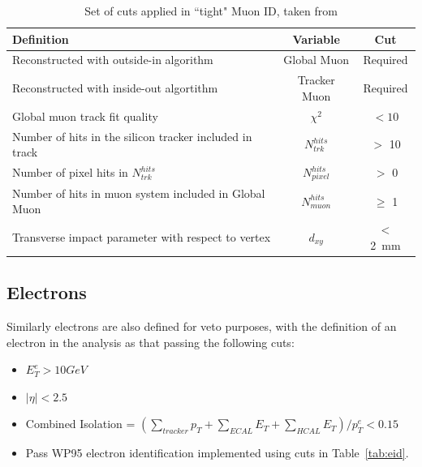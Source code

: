 \begin{table}[htbp]
\centering
\begin{tabular}{ m{8.9cm} c c }
\hline
\hline
 \centering Definition & Variable & Cut \\
\hline
\hline
 Reconstructed with outside-in algorithm & Global Muon & Required\\
Reconstructed with inside-out algortithm & Tracker Muon & Required\\
 Global muon track fit quality & $\chi^{2}$ & $< 10$ \\
Number of hits in the silicon tracker included in track & $N^{hits}_{\textit{trk}}$ &$ >$ 10\\
Number of pixel hits in $N^{hits}_{trk}$ & $N^{hits}_{\textit{pixel}}$ & $ > $ 0\\
Number of hits in muon system included in Global Muon & $N^{hits}_{\textit{muon}}$ & $\geq $ 1\\
Transverse impact parameter with respect to vertex & $d_{xy}$ & $< $ 2~mm\\
\hline
\end{tabular}
\caption{\label{tab:muid} Set of cuts applied in ``tight" Muon ID, taken from \cite{MUO-10-002}}
\end{table}



\subsection{Electrons}
Similarly electrons are also defined for veto purposes, with the definition of an electron in the analysis as that passing the following cuts:

\begin{itemize}
\item $E^{e}_{T} > 10 GeV$
\item $|\eta| < 2.5$
\item Combined Isolation = $(\sum_{tracker} p_{T} + \sum_{ECAL}E_{T} + \sum_{HCAL}E_{T})/p^{e}_{T} < 0.15$
\item Pass WP95 electron identification implemented using cuts in Table~\ref{tab:eid}.
\end{itemize}

